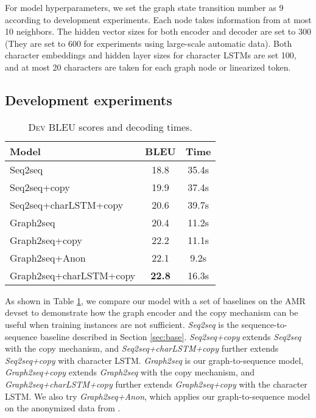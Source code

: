 \documentclass[11pt,a4paper]{article}
\begin{document}
For model hyperparameters, we set the graph state transition number as 9 according to development experiments.
Each node takes information from at most 10 neighbors. 
The hidden vector sizes for both encoder and decoder are set to 300 (They are set to 600 for experiments using large-scale automatic data).
Both character embeddings and hidden layer sizes for character LSTMs are set 100, and at most 20 characters are taken for each graph node or linearized token.

\subsection{Development experiments}
\label{sec:comp_sys}


\begin{table}
\centering
\begin{tabular}{l|c|c}
\hline
Model & BLEU & Time \\
\hline
\hline
Seq2seq & 18.8 & 35.4s \\ Seq2seq+copy & 19.9 & 37.4s \\ Seq2seq+charLSTM+copy & 20.6 & 39.7s \\ \hline
Graph2seq & 20.4 & 11.2s \\ Graph2seq+copy & 22.2 & 11.1s \\ Graph2seq+Anon & 22.1 & 9.2s \\ Graph2seq+charLSTM+copy & \textbf{22.8} & 16.3s \\ \hline
\end{tabular}
\caption{\textsc{Dev} BLEU scores and decoding times.}
\label{tab:dev_res}
\end{table}


As shown in Table \ref{tab:dev_res}, we compare our model with a set of baselines on the AMR devset to demonstrate how the graph encoder and the copy mechanism can be useful when training instances are not sufficient.
\emph{Seq2seq} is the sequence-to-sequence baseline described in Section \ref{sec:base}.
\emph{Seq2seq+copy} extends \emph{Seq2seq} with the copy mechanism, 
and \emph{Seq2seq+charLSTM+copy} further extends \emph{Seq2seq+copy} with character LSTM\@.
\emph{Graph2seq} is our graph-to-sequence model, \emph{Graph2seq+copy} extends \emph{Graph2seq} with the copy mechanism, and \emph{Graph2seq+charLSTM+copy} further extends \emph{Graph2seq+copy} with the character LSTM\@.
We also try \emph{Graph2seq+Anon}, which applies our graph-to-sequence model on the anonymized data from .
\end{document}
